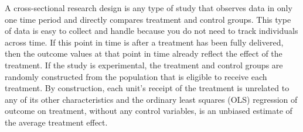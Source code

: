 \documentclass[
]{book}
\begin{document}
A cross-sectional research design is any type of study
that observes data in only one time period
and directly compares treatment and control groups.
This type of data is easy to collect and handle because
you do not need to track individuals across time.
If this point in time is after a treatment has been fully delivered,
then the outcome values at that point in time
already reflect the effect of the treatment.
If the study is experimental, the treatment and control groups are randomly constructed
from the population that is eligible to receive each treatment.
By construction, each unit's receipt of the treatment
is unrelated to any of its other characteristics
and the ordinary least squares (OLS) regression
of outcome on treatment, without any control variables,
is an unbiased estimate of the average treatment effect.
\end{document}
